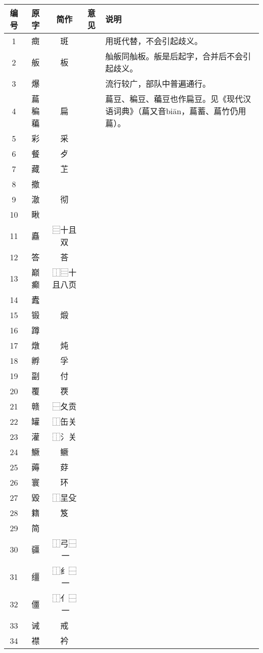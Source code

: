 \documentclass[12pt, fontset=none, UTF8, AutoFakeBold]{ctexbook}
\begin{document}
\begin{tabularx}{\linewidth}{|c|c|c|c|X|}
    \toprule
    编号 & 原字 & 简作 & 意见 & 说明 \\
    \midrule
    1 & 癍 & 斑 & & \quad{}用斑代替，不会引起歧义。 \\
    2 & 舨 & 板 & & \quad{}舢舨同舢板。舨是后起字，合并后不会引起歧义。 \\
    3 & 爆 & 𤆊 & & \quad{}流行较广，部队中普遍通行。 \\
    4 & 萹稨藊 & 扁 & & \quad{}萹豆、稨豆、藊豆也作扁豆。见《现代汉语词典》（萹又音bi\={a}n，萹蓄、萹竹仍用萹）。 \\
    5 & 彩 & 采 & & \\
    6 & 餐 & 歺 & & \\
    7 & 藏 & 䒙 & & \\
    8 & 撤 & 𢪃 & & \\
    9 & 澈 & 彻 & & \\
    10 & 瞅 & 𥄨 & & \\
    11 & 矗 & ⿳十且双 & & \\
    12 & 答 & 荅 & & \\
    13 & 巅癫 & ⿰⿳十且八页 & & \\
    14 & 蠹 & 𧉓 & & \\
    15 & 锻 & 煅 & & \\
    16 & 蹲 & 𧿬 & & \\
    17 & 燉 & 炖 & & \\
    18 & 孵 & 孚 & & \\
    19 & 副 & 付 & & \\
    20 & 覆 & 覄 & & \\
    21 & 赣 & ⿱夂贡 & & \\
    22 & 罐 & ⿰缶关 & & \\
    23 & 灌 & ⿰⺡关 & & \\
    24 & 鱖 & 鳜 & & \\
    25 & 薅 & 䒵 & & \\
    26 & 寰 & 环 & & \\
    27 & 毀 & ⿰圼殳 & & \\
    28 & 籍 & 笈 & & \\
    29 & 简 & 𫈉 & & \\
    30 & 疆 & ⿰弓⿱𰢴一 & & \\
    31 & 缰 & ⿰⺰⿱𰢴一 & & \\
    32 & 僵 & ⿰⺅⿱𰢴一 & & \\
    33 & 诫 & 戒 & & \\
    34 & 襟 & 衿 & & \\

\end{tabularx}
\end{document}

